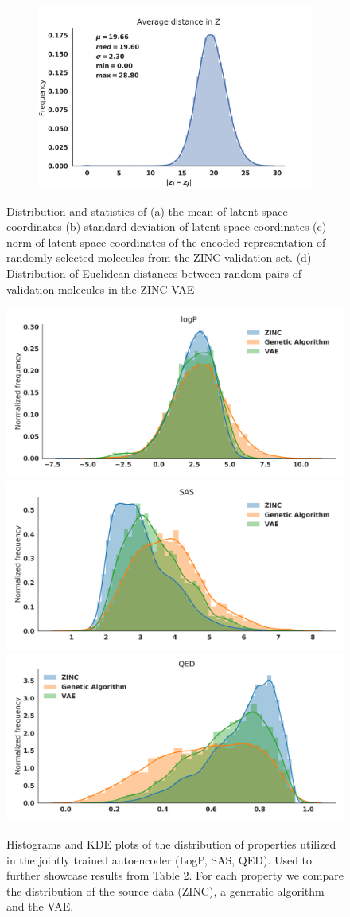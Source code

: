\begin{figure}[h]
\begin{subfigure}{0.45\textwidth}
  \end{subfigure}
  \begin{subfigure}{0.45\textwidth}
    \caption{}
    \includegraphics[width=\textwidth]{./distance_Z.png}
  \end{subfigure}
\caption[Latent Space Distribution Statistics]{Distribution and statistics of (a) the mean of latent space coordinates (b) standard deviation of latent space coordinates (c) norm of latent space coordinates of the encoded representation of randomly selected molecules from the ZINC validation set. (d) Distribution of Euclidean distances between random pairs of validation molecules in the ZINC VAE }
\label{fig:ls_stats}
\end{figure}


\begin{figure}
\centering
\includegraphics[width=0.3\columnwidth]{./logP.png}
\includegraphics[width=0.3\columnwidth]{./SAS.png}
\includegraphics[width=0.3\columnwidth]{./QED.png}

\caption[KDE plots for distribution of logP, SAS, and QED properties]{
Histograms and KDE plots of the distribution of properties utilized in the jointly trained autoencoder (LogP, SAS, QED). Used to further showcase results from Table 2. For each property we compare the distribution of the source data (ZINC), a generatic algorithm and the VAE.}
\label{fig:prop_dists}
\end{figure}


